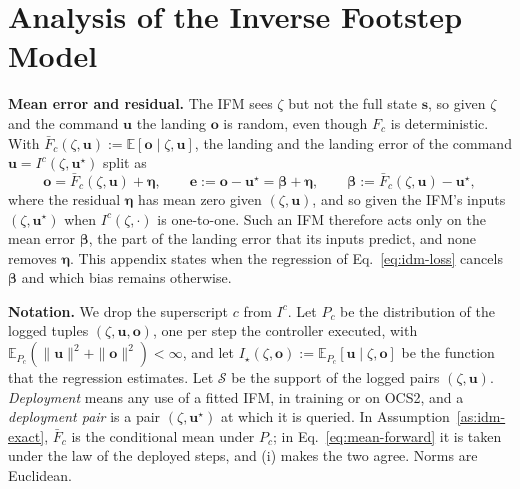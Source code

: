 \section{Analysis of the Inverse Footstep Model}
\label{app:idm-proofs}

\noindent\textbf{Mean error and residual.}
 The IFM sees $\zeta$ but not the full state $\mathbf s$, so
given $\zeta$ and the command $\mathbf u$ the landing $\mathbf o$ is random,
even though $F_c$ is deterministic. With $\bar F_c(\zeta,\mathbf u) :=
\mathbb E[\mathbf o \mid \zeta,\mathbf u]$, the landing and the landing
error of the command $\mathbf u = I^c(\zeta,\mathbf u^\star)$ split as
\begin{equation}
  \mathbf o = \bar F_c(\zeta,\mathbf u) + \boldsymbol\eta, \qquad
  \mathbf e := \mathbf o - \mathbf u^\star
    = \boldsymbol\beta + \boldsymbol\eta, \qquad
  \boldsymbol\beta := \bar F_c(\zeta,\mathbf u) - \mathbf u^\star ,
  \label{eq:mean-forward}
\end{equation}
where the residual $\boldsymbol\eta$ has mean zero given $(\zeta,\mathbf
u)$, and so given the IFM's inputs $(\zeta,\mathbf u^\star)$ when
$I^c(\zeta,\cdot)$ is one-to-one. Such an IFM therefore acts only on the
mean error $\boldsymbol\beta$, the part of the landing error that its
inputs predict, and none removes $\boldsymbol\eta$. This appendix states
when the regression of Eq.~\eqref{eq:idm-loss} cancels $\boldsymbol\beta$
and which bias remains otherwise.

\noindent\textbf{Notation.}
 We drop the superscript $c$ from $I^c$. Let $P_c$ be the
distribution of the logged tuples $(\zeta,\mathbf u,\mathbf o)$, one per
step the controller executed, with $\mathbb E_{P_c}(\|\mathbf u\|^2 +
\|\mathbf o\|^2) < \infty$, and let $I_\star(\zeta,\mathbf o) := \mathbb
E_{P_c}[\mathbf u \mid \zeta,\mathbf o]$ be the function that the
regression estimates. Let $\mathcal S$ be the support of the logged pairs
$(\zeta,\mathbf u)$. \emph{Deployment} means any use of a fitted IFM, in
training or on OCS2, and a \emph{deployment pair} is a pair
$(\zeta,\mathbf u^\star)$ at which it is queried. In
Assumption~\ref{as:idm-exact}, $\bar F_c$ is the conditional mean under
$P_c$; in Eq.~\eqref{eq:mean-forward} it is taken under the law of the
deployed steps, and (i) makes the two agree. Norms are Euclidean.

